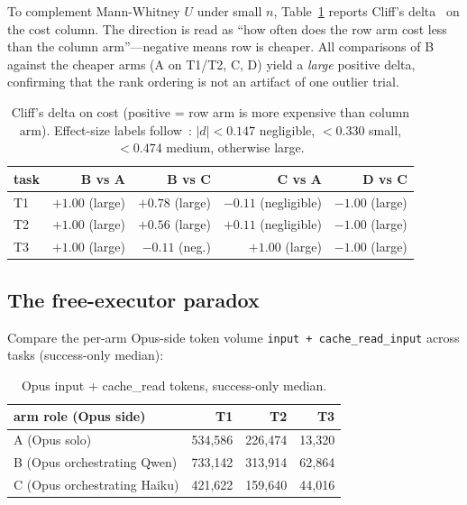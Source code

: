 \documentclass[11pt,a4paper]{article}
\begin{document}
To complement Mann-Whitney $U$ under small $n$, Table~\ref{tab:cliffs} reports Cliff's delta~\citep{romano2006effect} on the cost column. The direction is read as ``how often does the row arm cost less than the column arm''---negative means row is cheaper. All comparisons of B against the cheaper arms (A on T1/T2, C, D) yield a \emph{large} positive delta, confirming that the rank ordering is not an artifact of one outlier trial.

\begin{table}[H]
\centering
\small
\begin{tabular}{l r r r r}
\toprule
\textbf{task} & \textbf{B vs A} & \textbf{B vs C} & \textbf{C vs A} & \textbf{D vs C} \\
\midrule
T1 & $+1.00$ (large) & $+0.78$ (large)  & $-0.11$ (negligible) & $-1.00$ (large) \\
T2 & $+1.00$ (large) & $+0.56$ (large)  & $+0.11$ (negligible) & $-1.00$ (large) \\
T3 & $+1.00$ (large) & $-0.11$ (neg.)   & $+1.00$ (large)       & $-1.00$ (large) \\
\bottomrule
\end{tabular}
\caption{Cliff's delta on cost (positive = row arm is more expensive than column arm). Effect-size labels follow~\citet{romano2006effect}: $|d| < 0.147$ negligible, $< 0.330$ small, $< 0.474$ medium, otherwise large.}
\label{tab:cliffs}
\end{table}

\subsection{The free-executor paradox}

Compare the per-arm Opus-side token volume \texttt{input + cache\_read\_input} across tasks (success-only median):

\begin{table}[H]
\centering
\begin{tabular}{l r r r}
\toprule
\textbf{arm role (Opus side)} & \textbf{T1} & \textbf{T2} & \textbf{T3} \\
\midrule
A (Opus solo)               & 534{,}586 & 226{,}474 & 13{,}320 \\
B (Opus orchestrating Qwen) & 733{,}142 & 313{,}914 & 62{,}864 \\
C (Opus orchestrating Haiku) & 421{,}622 & 159{,}640 & 44{,}016 \\
\bottomrule
\end{tabular}
\caption{Opus input + cache\_read tokens, success-only median.}
\label{tab:opus-tokens}
\end{table}
\end{document}
